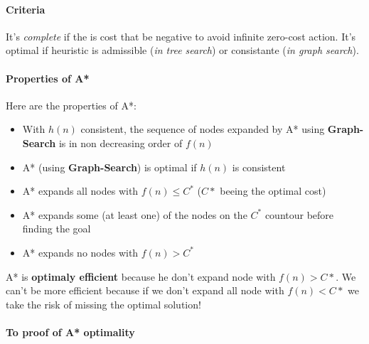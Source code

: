 \paragraph{Criteria} It's \textit{complete} if the is cost that be negative
to avoid infinite zero-cost action. 
It's optimal if heuristic is admissible (\textit{in tree search}) or consistante
(\textit{in graph search}).

\paragraph{Properties of A*}

Here are the properties of A*:
\begin{itemize}
    \item With $h(n)$ consistent, the sequence of nodes expanded by A* using \textbf{Graph-Search} is in non decreasing order of $f(n)$
    \item A* (using \textbf{Graph-Search}) is optimal if $h(n)$ is consistent
    \item A* expands all nodes with $f(n) \leq C^*$ ($C*$ beeing the optimal cost)
    \item A* expands some (at least one) of the nodes on the $C^*$ countour before finding the goal
    \item A* expands no nodes with $f(n) > C^*$ 
\end{itemize}

A*  is \textbf{optimaly  efficient} because  he don't  expand node  with
$f(n) > C*$. We  can't be more efficient because if  we don't expand all
node with $f(n) < C*$ we take the risk of missing the optimal solution!


\paragraph{To proof of A* optimality}


